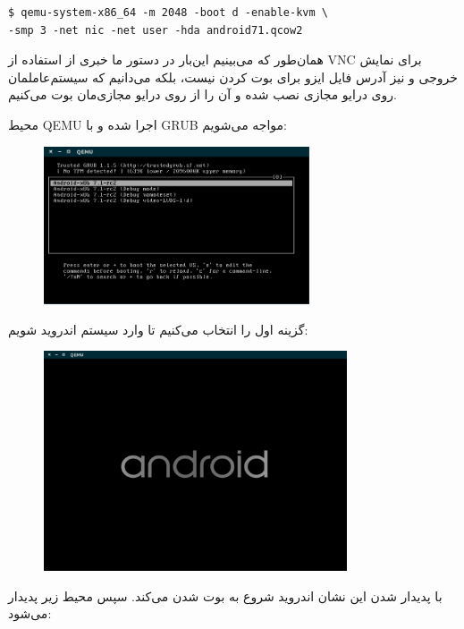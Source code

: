 \documentclass{article}
\begin{document}
\begin{latin}
\begin{verbatim}
$ qemu-system-x86_64 -m 2048 -boot d -enable-kvm \
-smp 3 -net nic -net user -hda android71.qcow2	
\end{verbatim}
\end{latin}

همان‌طور که می‌بینیم این‌بار در دستور ما خبری از استفاده از VNC برای نمایش خروجی و نیز آدرس فایل ایزو برای بوت کردن نیست، بلکه می‌دانیم که سیستم‌عاملمان روی درایو مجازی نصب شده و آن را از روی درایو مجازی‌مان بوت می‌کنیم.

محیط QEMU اجرا شده و با GRUB مواجه می‌شویم:

\begin{figure}[h]
	\centering	
	\includegraphics[width = 0.7\textwidth]{images/install16.png}
\end{figure}

گزینه اول را انتخاب می‌کنیم تا وارد سیستم اندروید شویم:

\newpage

\begin{figure}[h]
	\centering	
	\includegraphics[width = 0.8\textwidth]{images/install18.png}
\end{figure}

با پدیدار شدن این نشان اندروید شروع به بوت شدن می‌کند. سپس محیط زیر پدیدار می‌شود:
\end{document}
